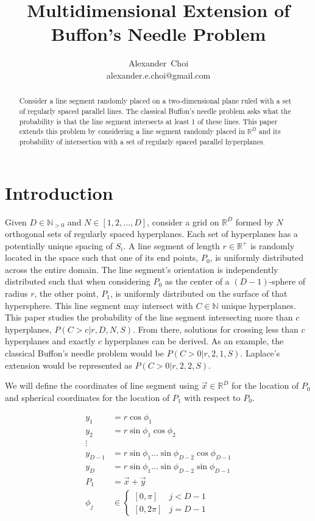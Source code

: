 \documentclass{article}
\title{Multidimensional Extension of Buffon's Needle Problem}
\author{ Alexander~Choi\\
	alexander.e.choi@gmail.com
}
\begin{document}
\maketitle

\begin{abstract}
	Consider a line segment randomly placed on a two-dimensional plane ruled with a set of regularly spaced parallel lines. The classical Buffon's needle problem
    asks what the probability is that the line segment intersects at least 1 of these lines. This paper extends this problem by considering a line segment randomly
    placed in $\mathbb{R}^D$ and its probability of intersection with a set of regularly spaced parallel hyperplanes. 
\end{abstract}



\section{Introduction}
Given $D\in\mathbb{N}_{>0}$ and $N\in[1,2,\dots,D]$, consider a grid on $\mathbb{R}^D$ formed by $N$ orthogonal sets of regularly spaced hyperplanes. Each set of hyperplanes
has a potentially unique spacing of $S_i$. A line segment of length $r\in\mathbb{R}^+$ is randomly located in the space such that one of its end points, $P_0$, is uniformly distributed
across the entire domain. The line segment's orientation is independently distributed such that when considering $P_0$ as the center of a $(D-1)$-sphere of radius $r$, the other point, $P_1$,
is uniformly distributed on the surface of that hypersphere. This line segment may intersect with $C\in\mathbb{N}$ unique hyperplanes. This paper studies the probability of
the line segment intersecting more than $c$ hyperplanes, $P(C>c|r, D, N, S)$. From there, solutions for crossing less than $c$ hyperplanes and exactly $c$ hyperplanes can
be derived.
As an example, the classical Buffon's needle problem would be $P(C>0|r, 2, 1, S)$. Laplace's extension would be represented as $P(C>0|r, 2, 2, S)$.

We will define the coordinates of line segment using $\vec{x}\in\mathbb{R}^D$ for the location of $P_0$ and spherical coordinates for the location of $P_1$ with respect to $P_0$.

\begin{align}
    y_1 &= r\cos{\phi_1}\\
    y_2 &= r\sin{\phi_1}\cos{\phi_2}\\
    \vdots\\
    y_{D-1} &= r\sin{\phi_1}\hdots\sin{\phi_{D-2}}\cos{\phi_{D-1}}\\
    y_{D} &= r\sin{\phi_1}\hdots\sin{\phi_{D-2}}\sin{\phi_{D-1}}\\
    P_1 &= \vec{x} + \vec{y}\\
	\phi_j &\in \begin{cases}[0, \pi] & j<D-1 \\ [0, 2\pi] & j=D-1\end{cases}
\end{align}
\end{document}
